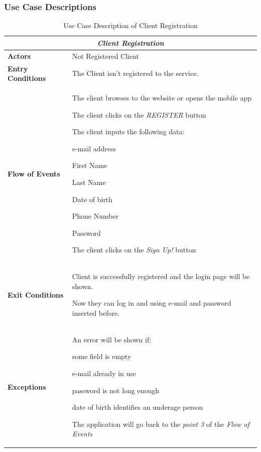 \documentclass[a4paper]{article}
\begin{document}
\begin{enumerate}[label=\bfseries G\arabic*:]
\subsubsection{Use Case Descriptions}

\renewcommand{\arraystretch}{1.25}

\begin{table} [H]
\begin{center}
\begin{tabular}{ |m{}|m{}|  }
\hline
    \multicolumn{2}{|c|}{\textbf{\textit{Client Registration}}} \\
\hline \hline
    \textbf{Actors}
&   Not Registered Client
\\ \hline
    \textbf{Entry Conditions}
&   The Client isn't registered to the service.
\\ \hline
    \textbf{Flow of Events}
& 
    \begin{enumerate*}
    \item The client browses to the website or opens the mobile app
    \item The client clicks on the \emph{REGISTER} button
    \item The client inputs the following data:
        \begin{enumerate*}
        \item e-mail address
        \item First Name
        \item Last Name
        \item Date of birth
        \item Phone Number
        \item Password
        \end{enumerate*}
    \item The client clicks on the \emph{Sign Up!} button
    \end{enumerate*}
\\ \hline
    \textbf{Exit Conditions}
&   Client is successfully registered and the login page will be shown. 

    Now they can log in and using e-mail and password inserted before.
\\ \hline
    \textbf{Exceptions}
&   
    An error will be shown if:
    \begin{itemize*}
    \item some field is empty
    \item e-mail already in use
    \item password is not long enough
    \item date of birth identifies an underage person
    \end{itemize*}
    The application will go back to the \emph{point 3} of the \emph{Flow of Events}
\\ \hline
\end{tabular}
\end{center}
\caption{Use Case Description of Client Registration}
\label{table:clientregistration}
\end{table}



\end{enumerate}
\end{document}
